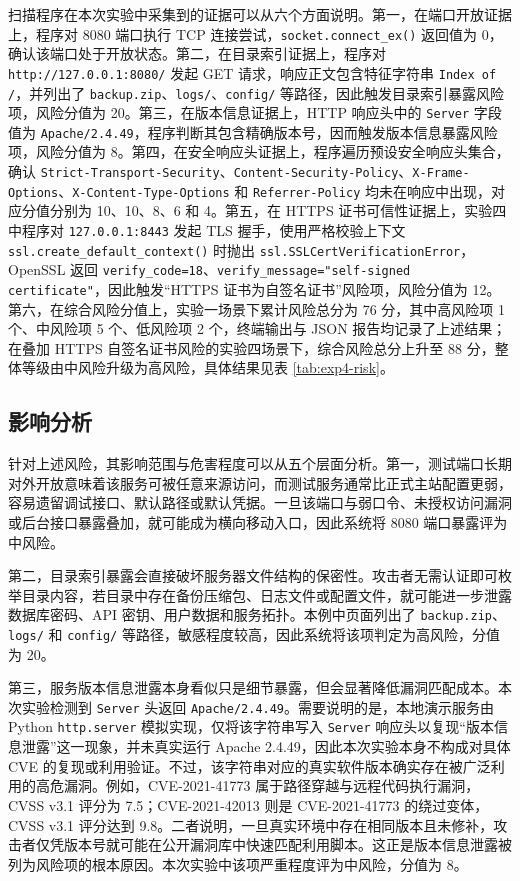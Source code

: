 \documentclass[12pt,a4paper,fontset=none]{ctexart}
\begin{document}
扫描程序在本次实验中采集到的证据可以从六个方面说明。第一，在端口开放证据上，程序对 8080 端口执行 TCP 连接尝试，\texttt{socket.connect\_ex()} 返回值为 0，确认该端口处于开放状态。第二，在目录索引证据上，程序对 \texttt{http://127.0.0.1:8080/} 发起 GET 请求，响应正文包含特征字符串 \texttt{Index of /}，并列出了 \texttt{backup.zip}、\texttt{logs/}、\texttt{config/} 等路径，因此触发目录索引暴露风险项，风险分值为 20。第三，在版本信息证据上，HTTP 响应头中的 \texttt{Server} 字段值为 \texttt{Apache/2.4.49}，程序判断其包含精确版本号，因而触发版本信息暴露风险项，风险分值为 8。第四，在安全响应头证据上，程序遍历预设安全响应头集合，确认 \texttt{Strict-Transport-Security}、\texttt{Content-Security-Policy}、\texttt{X-Frame-Options}、\texttt{X-Content-Type-Options} 和 \texttt{Referrer-Policy} 均未在响应中出现，对应分值分别为 10、10、8、6 和 4。第五，在 HTTPS 证书可信性证据上，实验四中程序对 \texttt{127.0.0.1:8443} 发起 TLS 握手，使用严格校验上下文 \texttt{ssl.\allowbreak create\_default\_context()} 时抛出 \texttt{ssl.\allowbreak SSLCertVerificationError}，OpenSSL 返回 \texttt{verify\_code=18}、\texttt{verify\_message=}\allowbreak\texttt{"self-signed certificate"}，因此触发“HTTPS 证书为自签名证书”风险项，风险分值为 12。第六，在综合风险分值上，实验一场景下累计风险总分为 76 分，其中高风险项 1 个、中风险项 5 个、低风险项 2 个，终端输出与 JSON 报告均记录了上述结果；在叠加 HTTPS 自签名证书风险的实验四场景下，综合风险总分上升至 88 分，整体等级由中风险升级为高风险，具体结果见表 \ref{tab:exp4-risk}。

\subsection{影响分析}

针对上述风险，其影响范围与危害程度可以从五个层面分析。第一，测试端口长期对外开放意味着该服务可被任意来源访问，而测试服务通常比正式主站配置更弱，容易遗留调试接口、默认路径或默认凭据。一旦该端口与弱口令、未授权访问漏洞或后台接口暴露叠加，就可能成为横向移动入口，因此系统将 8080 端口暴露评为中风险。

第二，目录索引暴露会直接破坏服务器文件结构的保密性。攻击者无需认证即可枚举目录内容，若目录中存在备份压缩包、日志文件或配置文件，就可能进一步泄露数据库密码、API 密钥、用户数据和服务拓扑。本例中页面列出了 \texttt{backup.zip}、\texttt{logs/} 和 \texttt{config/} 等路径，敏感程度较高，因此系统将该项判定为高风险，分值为 20。

第三，服务版本信息泄露本身看似只是细节暴露，但会显著降低漏洞匹配成本。本次实验检测到 \texttt{Server} 头返回 \texttt{Apache/2.4.49}。需要说明的是，本地演示服务由 Python \texttt{http.server} 模拟实现，仅将该字符串写入 \texttt{Server} 响应头以复现“版本信息泄露”这一现象，并未真实运行 Apache 2.4.49，因此本次实验本身不构成对具体 CVE 的复现或利用验证。不过，该字符串对应的真实软件版本确实存在被广泛利用的高危漏洞。例如，CVE-2021-41773 属于路径穿越与远程代码执行漏洞，CVSS v3.1 评分为 7.5；CVE-2021-42013 则是 CVE-2021-41773 的绕过变体，CVSS v3.1 评分达到 9.8。二者说明，一旦真实环境中存在相同版本且未修补，攻击者仅凭版本号就可能在公开漏洞库中快速匹配利用脚本。这正是版本信息泄露被列为风险项的根本原因。本次实验中该项严重程度评为中风险，分值为 8。
\end{document}
